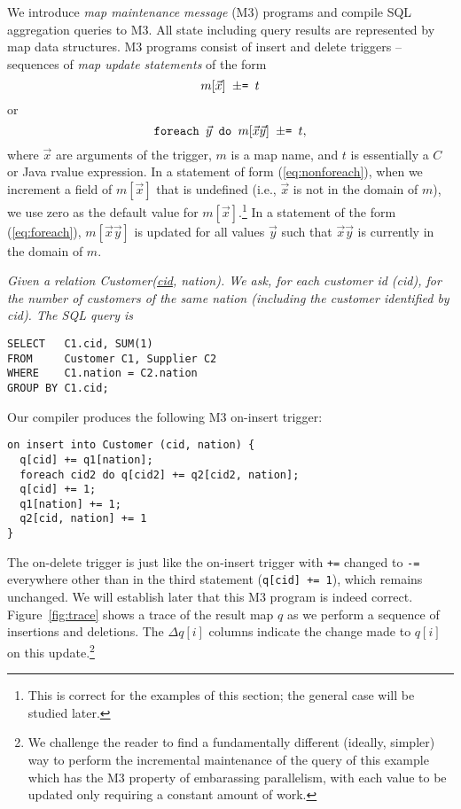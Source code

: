 We introduce {\em map maintenance message}\/ (M3) programs and
compile SQL aggregation queries to M3.
All state including query results are represented by map data
structures. 
M3 programs consist of insert and delete triggers -- sequences
of {\em map update statements}\/ of the form
\begin{equation}
\mbox{{\tt $m[\vec{x}]$ $\pm$= $t$}}
\label{eq:nonforeach}
\end{equation}
or
\begin{equation}
\mbox{{\tt foreach $\vec{y}$ do $m[\vec{x}\vec{y}]$ $\pm$= $t$}},
\label{eq:foreach}
\end{equation}
where $\vec{x}$ are arguments of the trigger,
$m$ is a map name, and $t$ is essentially a $C$ or Java rvalue expression.
In a statement of form (\ref{eq:nonforeach}),
when we increment a field of $m[\vec{x}]$
that is undefined (i.e., $\vec{x}$ is not in the domain of $m$),
we use zero as the default value for $m[\vec{x}]$.\footnote{This is correct
for the examples of this section; the general case will be studied later.}
In a statement of the form (\ref{eq:foreach}),
$m[\vec{x}\vec{y}]$ is updated for all
values $\vec{y}$ such that $\vec{x}\vec{y}$ is currently in the
domain of $m$.


\begin{example}\em
\label{ex:self-join}
Given a relation Customer(\underline{cid}, nation).
We ask, for each customer id (cid),
for the number of customers of the same nation (including the customer
identified by cid).
The SQL query is
\begin{verbatim}
SELECT   C1.cid, SUM(1)
FROM     Customer C1, Supplier C2
WHERE    C1.nation = C2.nation
GROUP BY C1.cid;
\end{verbatim}
Our compiler produces the following M3 on-insert trigger:
\begin{verbatim}
on insert into Customer (cid, nation) {
  q[cid] += q1[nation];
  foreach cid2 do q[cid2] += q2[cid2, nation];
  q[cid] += 1;
  q1[nation] += 1;
  q2[cid, nation] += 1
}
\end{verbatim}
The on-delete trigger is just like the on-insert trigger with {\tt +=}
changed to {\tt -=} everywhere other than in the third statement
({\tt q[cid] += 1}), which remains unchanged.
We will establish later that this M3 program is indeed correct.
Figure~\ref{fig:trace} shows a trace of the result map $q$ as we perform
a sequence of insertions and deletions. The $\Delta q[i]$ columns
indicate the change made to $q[i]$ on this update.\footnote{We
challenge the reader to find a 
fundamentally different (ideally, simpler) way to
perform the incremental maintenance of the query of this example
which has the M3 property of embarassing parallelism, with each value
to be updated only requiring a constant amount of work.}
\punto
\end{example}


